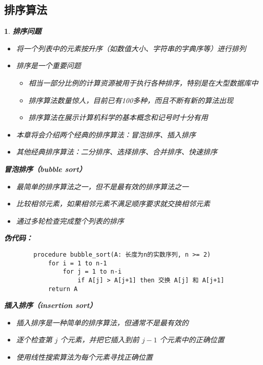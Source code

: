 \documentclass[UTF8]{report}
\theoremstyle{MyLineTheoremStyle} %
\theoremstyle{MyBlockTheoremStyle} %
\theoremstyle{MySubsubsectionStyle} %
\newtheorem{definition}{}
\begin{document}
\subsection{排序算法}

\begin{definition}
    \textbf{排序问题}\par
    \begin{itemize}
        \item 将一个列表中的元素按升序（如数值大小、字符串的字典序等）进行排列
        \item 排序是一个重要问题
        \begin{itemize}
            \item 相当一部分比例的计算资源被用于执行各种排序，特别是在大型数据库中
            \item 排序算法数量惊人，目前已有100多种，而且不断有新的算法出现
            \item 排序算法在展示计算机科学的基本概念和记号时十分有用
        \end{itemize}
        \item 本章将会介绍两个经典的排序算法：冒泡排序、插入排序
        \item 其他经典排序算法：二分排序、选择排序、合并排序、快速排序
    \end{itemize}

    \textbf{冒泡排序（bubble sort）}\par
    \begin{itemize}
        \item 最简单的排序算法之一，但不是最有效的排序算法之一
        \item 比较相邻元素，如果相邻元素不满足顺序要求就交换相邻元素
        \item 通过多轮检查完成整个列表的排序
    \end{itemize}

    \textbf{伪代码：}\par
    \begin{verbatim}
        procedure bubble_sort(A: 长度为n的实数序列, n >= 2)
            for i = 1 to n-1
                for j = 1 to n-i
                    if A[j] > A[j+1] then 交换 A[j] 和 A[j+1]
            return A
    \end{verbatim}

    \textbf{插入排序（insertion sort）}\par
    \begin{itemize}
        \item 插入排序是一种简单的排序算法，但通常不是最有效的
        \item 逐个检查第 $j$ 个元素，并把它插入到前 $j-1$ 个元素中的正确位置
        \item 使用线性搜索算法为每个元素寻找正确位置
    \end{itemize}


\end{definition}
\end{document}

